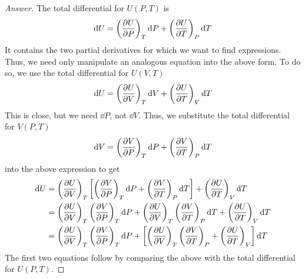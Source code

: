 \documentclass[../psets.tex]{subfiles}
\begin{document}
\begin{enumerate}
\begin{proof}[Answer]
        The total differential for $U(P,T)$ is
        \begin{equation*}
            \dd{U} = \left( \pdv{U}{P} \right)_T\dd{P}+\left( \pdv{U}{T} \right)_P\dd{T}
        \end{equation*}
        It contains the two partial derivatives for which we want to find expressions. Thus, we need only manipulate an analogous equation into the above form. To do so, we use the total differential for $U(V,T)$
        \begin{equation*}
            \dd{U} = \left( \pdv{U}{V} \right)_T\dd{V}+\left( \pdv{U}{T} \right)_V\dd{T}
        \end{equation*}
        This is close, but we need $\dd{P}$, not $\dd{V}$. Thus, we substitute the total differential for $V(P,T)$
        \begin{equation*}
            \dd{V} = \left( \pdv{V}{P} \right)_T\dd{P}+\left( \pdv{V}{T} \right)_P\dd{T}
        \end{equation*}
        into the above expression to get
        \begin{align*}
            \dd{U} &= \left( \pdv{U}{V} \right)_T\left[ \left( \pdv{V}{P} \right)_T\dd{P}+\left( \pdv{V}{T} \right)_P\dd{T} \right]+\left( \pdv{U}{T} \right)_V\dd{T}\\
            &= \left( \pdv{U}{V} \right)_T\left( \pdv{V}{P} \right)_T\dd{P}+\left( \pdv{U}{V} \right)_T\left( \pdv{V}{T} \right)_P\dd{T}+\left( \pdv{U}{T} \right)_V\dd{T}\\
            &= \left( \pdv{U}{V} \right)_T\left( \pdv{V}{P} \right)_T\dd{P}+\left[ \left( \pdv{U}{V} \right)_T\left( \pdv{V}{T} \right)_P+\left( \pdv{U}{T} \right)_V \right]\dd{T}
        \end{align*}
        The first two equations follow by comparing the above with the total differential for $U(P,T)$.\par

\end{proof}
\end{enumerate}
\end{document}
